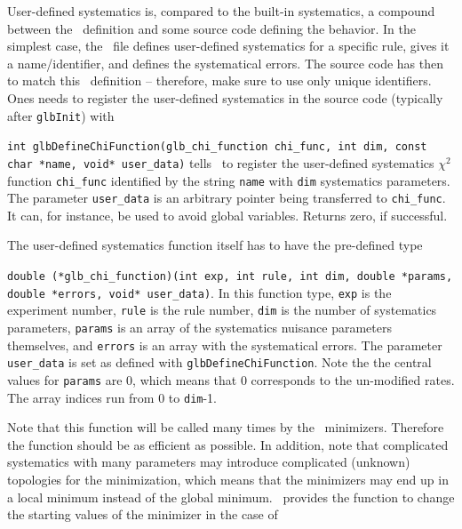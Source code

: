 User-defined systematics is, compared to the built-in systematics, a compound between
the \AEDL\ definition and some source code defining the behavior. In the simplest case,
the \AEDL\ file defines user-defined systematics for a specific rule, gives it a 
name/identifier, and defines the systematical errors. The source code has then to match this \AEDL\
definition -- therefore, make sure to use only unique identifiers. 
Ones needs to register the user-defined systematics in the 
source code (typically after {\tt glbInit}) with
\begin{function}
{\tt int glbDefineChiFunction(glb\_chi\_function chi\_func, int dim, const char *name, void* user\_data)}
 tells \GLOBES\ to register the user-defined systematics $\chi^2$ function {\tt chi\_func} 
identified by the string {\tt name} with {\tt dim} systematics parameters. The parameter {\tt user\_data}
is an arbitrary pointer being transferred to {\tt chi\_func}. It can, for instance, be used to avoid
global variables. Returns zero, if successful.
\end{function}
The user-defined systematics function itself has to have the pre-defined type 
\begin{function}
{\tt double (*glb\_chi\_function)(int exp, int rule, int dim, double *params, double *errors, void* user\_data)}.
In this function type, {\tt exp} is the experiment number, {\tt rule} is the rule number, {\tt dim} is the number of systematics parameters, {\tt params} is an array of the systematics nuisance parameters themselves, and {\tt errors} is an array with the systematical errors. The parameter {\tt user\_data} is set as defined with
{\tt glbDefineChiFunction}.
Note the the central values for {\tt params} are $0$, which means that $0$ corresponds to the un-modified rates. The array indices run from $0$ to {\tt dim}-1.
\end{function}
Note that this function will be called many times by the \GLOBES\ minimizers.
Therefore the function should be as efficient as possible.
In addition, note that complicated systematics with many parameters may introduce complicated (unknown) topologies for the minimization, which means that the minimizers may
end up in a local minimum instead of the global minimum. \GLOBES\ provides the function \GLB{SetSysStartingValuesList} to change the starting values of the minimizer in the case of
